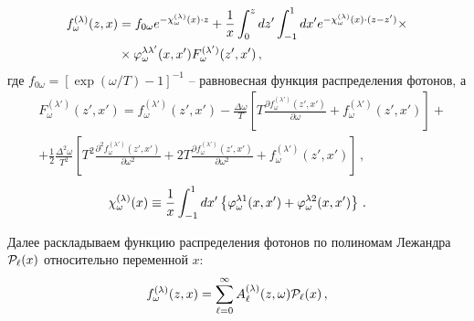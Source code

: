 \documentclass[a4paper]{panl}
\begin{document}
\begin{equation}\label{FormSol}
\begin{aligned}
f_\omega^{(\lambda)}(z,x)&=f_{0\omega} 	e^{-{\cal \chi}_\omega^{(\lambda)}(x)\cdot z} + \frac{1}{x}\int_{0}^{z}dz'\int_{-1}^{1}dx' e^{-{\cal \chi}_\omega^{(\lambda)}(x)\cdot (z-z')}\times 
\\
&\times\varphi_\omega^{\lambda 	\lambda'}(x,x')F_\omega^{(\lambda')}(z',x')\, ,
\end{aligned}	
\end{equation}
где $f_{0\omega}=[\exp(\omega/T)-1]^{-1}$ -- равновесная функция распределения фотонов, а
\begin{equation}\label{eq:ThrF}
	\begin{aligned}
		&F_\omega^{(\lambda')}(z',x') = f_\omega^{(\lambda')}(z',x') - \frac{\Delta \omega}{T}
		\left[
		T \frac{\partial f_\omega^{(\lambda')}(z',x')}{\partial \omega} + f_\omega^{(\lambda')}(z',x')
		\right]+
		\\
		&+ \frac{1}{2}\frac{\Delta^2 \omega}{T^2}
		\left[
		T^2 \frac{\partial^2 f_\omega^{(\lambda')}(z',x')}{\partial \omega^2} + 2T \frac{\partial f_\omega^{(\lambda')}(z',x')}{\partial \omega^2}+f_\omega^{(\lambda')}(z',x')
		\right]\, ,
	\end{aligned}
\end{equation}
	\begin{equation}
{\cal \chi}_\omega^{(\lambda)}(x) \equiv \frac{1}{x} \int_{-1}^{1} dx' \left\{\varphi^{\lambda 1}_\omega(x,x')+\varphi^{\lambda 2}_\omega(x,x')\right\}\, .
\end{equation}

Далее раскладываем функцию распределения фотонов по полиномам Лежандра ${\cal P}_\ell(x)$ относительно переменной $x$:
\begin{equation}\label{eq:fSerLegender}
	f_\omega^{(\lambda)}(z, x) = \sum_{\ell = 0}^{\infty} A_\ell^{(\lambda)}(z,\omega) {\cal P}_\ell(x)\, ,
\end{equation}
\end{document}
